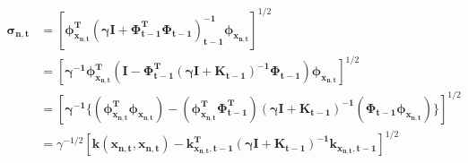 \documentclass[11pt]{article}
\begin{document}
\begin{enumerate}
\begin{align}
\mathbf{\sigma_{n,t}} &=  \mathbf{[\phi^T_{x_{n,t}} (\gamma I + \Phi^T_{t-1}\Phi_{t-1})^{-1}_{t-1} \phi_{x_{n,t}} ]}^{1/2}  \nonumber \\
&= \mathbf{[\gamma^{-1} \phi^T_{x_{n,t}} (I - \Phi^T_{t-1} (\gamma I + K_{t-1})^{-1}\Phi_{t-1}) \phi_{x_{n,t}}]}^{1/2}   \nonumber \\
&= \mathbf{[\gamma^{-1}  \{(\phi^T_{x_{n,t}} \phi_{x_{n,t}})- (\phi^T_{x_{n,t}} \Phi^T_{t-1}) (\gamma I + K_{t-1})^{-1} (\Phi_{t-1}  \phi_{x_{n,t}})\} ]}^{1/2}   \nonumber \\
&= \gamma^{-1/2} \mathbf{ [k(x_{n,t},x_{n,t}) - k^T_{x_{n,t},t-1} (\gamma I + K_{t-1})^{-1} k_{x_{n,t},t-1} ]}^{1/2}
\end{align}






\end{enumerate}
\end{document}
